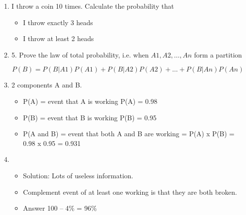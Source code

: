 \documentclass[a4paper,12pt]{article}
\begin{document}
\begin{enumerate}	
	\item  I throw a coin 10 times. Calculate the probability that 
	\begin{itemize}
		\item I throw exactly 3 heads
	\item  I throw at least 2 heads
	\end{itemize}	

	
	\item 
	5. Prove the law of total probability, i.e. when $A1 , A2 , \ldots, An$ form a partition
	
	\[	P(B) = P(B|A1)P(A1) + P(B|A2)P(A2) + … + P(B|An)P(An)\]
	

	\item 
	2 components A and B.
	\begin{itemize}
		\item P(A) = event that A is working		P(A) = 0.98
		\item P(B) = event that B is working			P(B) = 0.95
		\item P(A and B) = event that both A and B are working = P(A) x P(B) = 0.98 x 0.95 = 0.931
		
	\end{itemize}
	
	\item 
	\begin{itemize}
	\item Solution: Lots of useless information.
	\item Complement event of at least one working is that they are both broken.
	\item Answer  100 – 4\% = 96\%
	\end{itemize}
	
\end{enumerate}
\end{document}
